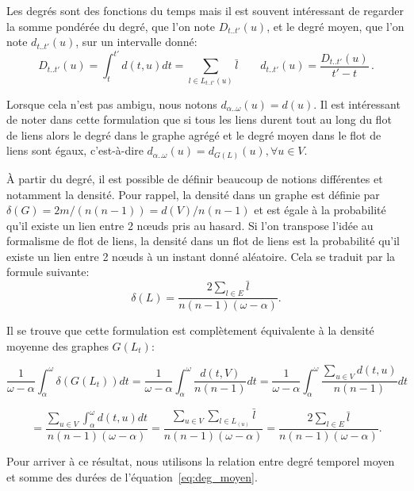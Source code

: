Les degrés sont des fonctions du temps mais il est souvent intéressant de regarder la somme pondérée du degré, que l'on note $D_{t..t'}(u)$, et le degré moyen, que l'on note $d_{t..t'}(u)$, sur un intervalle donné:
\begin{equation}
D_{t..t'}(u)= \int_{t}^{t'}d(t,u) dt  = \sum_{l \in L_{t..t'}(u)}\bar{l} \qquad
d_{t..t'}(u)= \dfrac{D_{t..t'}(u)}{t'-t}\, .
\label{eq:deg_moyen}
\end{equation}

Lorsque cela n'est pas ambigu, nous notons $d_{\alpha..\omega}(u) = d(u)$.
Il est intéressant de noter dans cette formulation que si tous les liens durent tout au long du flot de liens alors le degré dans le graphe agrégé et le degré moyen dans le flot de liens sont égaux, c'est-à-dire  $d_{\alpha..\omega}(u) = d_{G(L)}(u), \forall u \in V$.

\`A partir du degré, il est possible de définir beaucoup de notions différentes et notamment la densité.
Pour rappel, la densité dans un graphe est définie par $\delta(G)=2m/(n(n-1))=d(V)/n(n-1)$ et est égale à la probabilité qu'il existe un lien entre 2 n\oe{}uds pris au hasard.
Si l'on transpose l'idée au formalisme de flot de liens, la densité dans un flot de liens est la probabilité qu'il existe un lien entre 2 n\oe{}uds à un instant donné aléatoire.
Cela se traduit par la formule suivante:
\begin{equation}
\delta(L)= \dfrac{2 \sum_{l \in E}\bar{l}}{n(n-1) (\omega-\alpha)}.
\end{equation}

Il se trouve que cette formulation est complètement équivalente à la densité moyenne des graphes $G(L_t)$:

\begin{equation*}
\dfrac{1}{\omega-\alpha} \int_{\alpha}^{\omega} \delta(G(L_t)) dt=
\dfrac{1}{\omega-\alpha} \int_{\alpha}^{\omega} \dfrac{d(t,V)}{n(n-1)}dt=
 \dfrac{1}{\omega-\alpha} \int_{\alpha}^{\omega} \dfrac{\sum_{u \in V} d(t,u)}{n(n-1)}dt
 \end{equation*}

 \begin{equation*}
= \dfrac{\sum_{u \in V} \int_{\alpha}^{\omega}d(t,u)dt}{n(n-1)(\omega-\alpha)} =
\dfrac{\sum_{u \in V} \sum_{l \in L_(u)} \bar{l}}{n(n-1)(\omega-\alpha)} =
\dfrac{2\sum_{l \in E}\bar{l}}{n(n-1) (\omega-\alpha)} .
\end{equation*}

Pour arriver à ce résultat, nous utilisons la relation entre degré temporel moyen et somme des durées de l'équation~\ref{eq:deg_moyen}.

